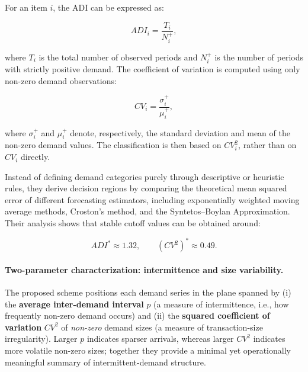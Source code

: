 For an item \(i\), the ADI can be expressed as:

\begin{equation}
    ADI_i = \frac{T_i}{N_i^{+}},
    \label{eq:adi_ch2}
\end{equation}

where \(T_i\) is the total number of observed periods and \(N_i^{+}\) is the number of periods with strictly positive demand. The coefficient of variation is computed using only non-zero demand observations:

\begin{equation}
    CV_i = \frac{\sigma_i^{+}}{\mu_i^{+}},
    \label{eq:cv_ch2}
\end{equation}

where \(\sigma_i^{+}\) and \(\mu_i^{+}\) denote, respectively, the standard deviation and mean of the non-zero demand values. The classification is then based on \(CV_i^2\), rather than on \(CV_i\) directly.

Instead of defining demand categories purely through descriptive or heuristic rules, they derive decision regions by comparing the theoretical mean squared error of different forecasting estimators, including exponentially weighted moving average methods, Croston's method, and the Syntetos--Boylan Approximation. Their analysis shows that stable cutoff values can be obtained around:

\begin{equation}
    ADI^* \approx 1.32,
    \qquad
    (CV^2)^* \approx 0.49.
    \label{eq:adi_cv2_cutoffs_ch2}
\end{equation}
\paragraph{Two-parameter characterization: intermittence and size variability.}
The proposed scheme positions each demand series in the plane spanned by (i) the \textbf{average inter-demand interval} $p$ (a measure of intermittence, i.e., how frequently non-zero demand occurs) and (ii) the \textbf{squared coefficient of variation} $CV^2$ of \emph{non-zero} demand sizes (a measure of transaction-size irregularity).
Larger $p$ indicates sparser arrivals, whereas larger $CV^2$ indicates more volatile non-zero sizes; together they provide a minimal yet operationally meaningful summary of intermittent-demand structure.

